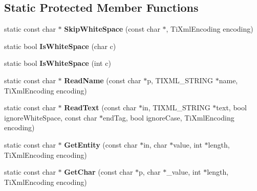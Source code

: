 \subsection*{\-Static \-Protected \-Member \-Functions}
\begin{DoxyCompactItemize}
\item 
\hypertarget{classTiXmlBase_ac0c3d66d8a9e6996a1fa016275e16875}{
static const char $\ast$ {\bfseries \-Skip\-White\-Space} (const char $\ast$, \-Ti\-Xml\-Encoding encoding)}
\label{d8/d47/classTiXmlBase_ac0c3d66d8a9e6996a1fa016275e16875}

\item 
\hypertarget{classTiXmlBase_af56296d561c0bab4bc8e198cdcf5c48e}{
static bool {\bfseries \-Is\-White\-Space} (char c)}
\label{d8/d47/classTiXmlBase_af56296d561c0bab4bc8e198cdcf5c48e}

\item 
\hypertarget{classTiXmlBase_a3de391ea9f4c4a8aa10d04480b048795}{
static bool {\bfseries \-Is\-White\-Space} (int c)}
\label{d8/d47/classTiXmlBase_a3de391ea9f4c4a8aa10d04480b048795}

\item 
\hypertarget{classTiXmlBase_a1c21a6ab5f7b503acd91f35f183734b3}{
static const char $\ast$ {\bfseries \-Read\-Name} (const char $\ast$p, \-T\-I\-X\-M\-L\-\_\-\-S\-T\-R\-I\-N\-G $\ast$name, \-Ti\-Xml\-Encoding encoding)}
\label{d8/d47/classTiXmlBase_a1c21a6ab5f7b503acd91f35f183734b3}

\item 
\hypertarget{classTiXmlBase_aa646c74921aa33156968b802bbf5566e}{
static const char $\ast$ {\bfseries \-Read\-Text} (const char $\ast$in, \-T\-I\-X\-M\-L\-\_\-\-S\-T\-R\-I\-N\-G $\ast$text, bool ignore\-White\-Space, const char $\ast$end\-Tag, bool ignore\-Case, \-Ti\-Xml\-Encoding encoding)}
\label{d8/d47/classTiXmlBase_aa646c74921aa33156968b802bbf5566e}

\item 
\hypertarget{classTiXmlBase_ac5c08bf3deffcda0bf8ce2958372b584}{
static const char $\ast$ {\bfseries \-Get\-Entity} (const char $\ast$in, char $\ast$value, int $\ast$length, \-Ti\-Xml\-Encoding encoding)}
\label{d8/d47/classTiXmlBase_ac5c08bf3deffcda0bf8ce2958372b584}

\item 
\hypertarget{classTiXmlBase_a5b0fde72d6f662ae1fd6303195d2159b}{
static const char $\ast$ {\bfseries \-Get\-Char} (const char $\ast$p, char $\ast$\-\_\-value, int $\ast$length, \-Ti\-Xml\-Encoding encoding)}
\label{d8/d47/classTiXmlBase_a5b0fde72d6f662ae1fd6303195d2159b}


\end{DoxyCompactItemize}
